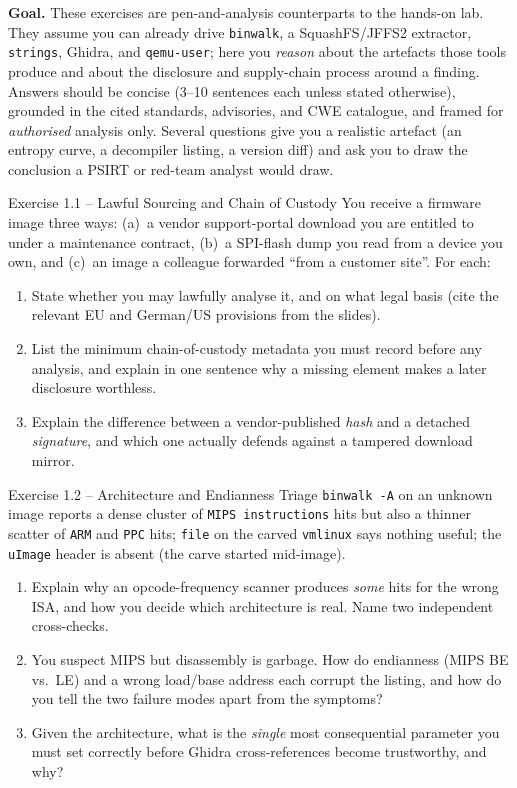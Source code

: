 \documentclass[11pt,a4paper]{article}
\begin{document}
\sheetheader

\noindent
\textbf{Goal.} These exercises are pen-and-analysis counterparts to the hands-on lab. They
assume you can already drive \texttt{binwalk}, a SquashFS/JFFS2 extractor, \texttt{strings},
Ghidra, and \texttt{qemu-user}; here you \emph{reason} about the artefacts those tools produce
and about the disclosure and supply-chain process around a finding. Answers should be concise
(3--10 sentences each unless stated otherwise), grounded in the cited standards, advisories,
and CWE catalogue, and framed for \emph{authorised} analysis only. Several questions give you a
realistic artefact (an entropy curve, a decompiler listing, a version diff) and ask you to draw
the conclusion a PSIRT or red-team analyst would draw.

\begin{taskbox}{Exercise 1.1 -- Lawful Sourcing and Chain of Custody}
You receive a firmware image three ways: (a)~a vendor support-portal download you are entitled
to under a maintenance contract, (b)~a SPI-flash dump you read from a device you own, and
(c)~an image a colleague forwarded ``from a customer site''. For each:
\begin{enumerate}\setlength{\itemsep}{0pt}
  \item State whether you may lawfully analyse it, and on what legal basis (cite the relevant
        EU and German/US provisions from the slides).
  \item List the minimum chain-of-custody metadata you must record before any analysis, and
        explain in one sentence why a missing element makes a later disclosure worthless.
  \item Explain the difference between a vendor-published \emph{hash} and a detached
        \emph{signature}, and which one actually defends against a tampered download mirror.
\end{enumerate}
\end{taskbox}

\begin{taskbox}{Exercise 1.2 -- Architecture and Endianness Triage}
\texttt{binwalk -A} on an unknown image reports a dense cluster of \texttt{MIPS instructions}
hits but also a thinner scatter of \texttt{ARM} and \texttt{PPC} hits; \texttt{file} on the
carved \texttt{vmlinux} says nothing useful; the \texttt{uImage} header is absent (the carve
started mid-image).
\begin{enumerate}\setlength{\itemsep}{0pt}
  \item Explain why an opcode-frequency scanner produces \emph{some} hits for the wrong ISA,
        and how you decide which architecture is real. Name two independent cross-checks.
  \item You suspect MIPS but disassembly is garbage. How do endianness (MIPS BE vs.\ LE) and
        a wrong load/base address each corrupt the listing, and how do you tell the two
        failure modes apart from the symptoms?
  \item Given the architecture, what is the \emph{single} most consequential parameter you must
        set correctly before Ghidra cross-references become trustworthy, and why?
\end{enumerate}
\end{taskbox}
\end{document}
